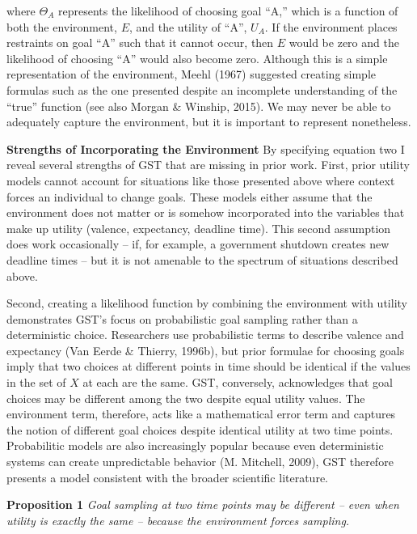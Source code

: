 \documentclass[english,man]{apa6}
\theoremstyle{definition}
\theoremstyle{definition}
\theoremstyle{definition}
\theoremstyle{remark}
\begin{document}
\noindent where \(\Theta_{A}\) represents the likelihood of choosing
goal \enquote{A,} which is a function of both the environment, \(E\),
and the utility of \enquote{A}, \(U_{A}\). If the environment places
restraints on goal \enquote{A} such that it cannot occur, then \(E\)
would be zero and the likelihood of choosing \enquote{A} would also
become zero. Although this is a simple representation of the
environment, Meehl (1967) suggested creating simple formulas such as the
one presented despite an incomplete understanding of the \enquote{true}
function (see also Morgan \& Winship, 2015). We may never be able to
adequately capture the environment, but it is important to represent
nonetheless.

\textbf{Strengths of Incorporating the Environment} By specifying
equation two I reveal several strengths of GST that are missing in prior
work. First, prior utility models cannot account for situations like
those presented above where context forces an individual to change
goals. These models either assume that the environment does not matter
or is somehow incorporated into the variables that make up utility
(valence, expectancy, deadline time). This second assumption does work
occasionally -- if, for example, a government shutdown creates new
deadline times -- but it is not amenable to the spectrum of situations
described above.

Second, creating a likelihood function by combining the environment with
utility demonstrates GST's focus on probabilistic goal sampling rather
than a deterministic choice. Researchers use probabilistic terms to
describe valence and expectancy (Van Eerde \& Thierry, 1996b), but prior
formulae for choosing goals imply that two choices at different points
in time should be identical if the values in the set of \(X\) at each
are the same. GST, conversely, acknowledges that goal choices may be
different among the two despite equal utility values. The environment
term, therefore, acts like a mathematical error term and captures the
notion of different goal choices despite identical utility at two time
points. Probabilitic models are also increasingly popular because even
deterministic systems can create unpredictable behavior (M. Mitchell,
2009), GST therefore presents a model consistent with the broader
scientific literature.

\textbf{Proposition 1} \emph{Goal sampling at two time points may be
different -- even when utility is exactly the same -- because the
environment forces sampling.}
\end{document}
